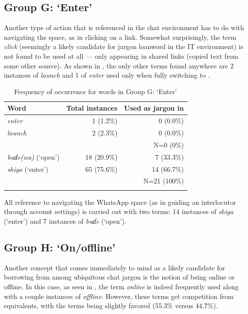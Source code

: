\documentclass[output=paper
,newtxmath
,modfonts
,nonflat]{langsci/langscibook}
\begin{document}
\subsection{Group G: ‘Enter’}

Another type of action that is referenced in the chat environment has to do with navigating the space, as in clicking on a link. Somewhat surprisingly, the  term \textit{click} (seemingly a likely candidate for jargon loanword in the IT environment) is not found to be used at all — only appearing in shared links (copied text from some other source). As shown in , the only other  terms found anywhere are 2 instances of \textit{launch} and 1 of \textit{enter} used only when fully switching to . 

\begin{table}
\begin{tabularx}{\textwidth}{Qrr}
\lsptoprule
Word & Total instances & Used as jargon in \\
\midrule
\textit{enter}  & 1 (1.2\%) & 0 (0.0\%)\\
\textit{launch} & 2 (2.3\%) & 0 (0.0\%)\\\midrule
& & N=0 (0\%)\\\midrule
\textit{buɗe(wa)} (‘open’) & 18 (20.9\%) & 7 (33.3\%)\\
\textit{shiga} (‘enter’)   & 65 (75.6\%) & 14 (66.7\%)\\\midrule
& & N=21 (100\%)\\
\lspbottomrule
\end{tabularx}
\caption{Frequency of occurrence for words in Group G: ‘Enter’}
\label{tab:purvis:9}
\end{table} 

All reference to navigating the WhatsApp space (as in guiding an interlocutor through account settings) is carried out with two  terms: 14 instances of \textit{shiga} (‘enter’) and 7 instances of \textit{buɗe} (‘open’).

\subsection{Group H: ‘On/offline’}

Another concept that comes immediately to mind as a likely candidate for borrowing from among ubiquitous  chat jargon is the notion of being online or offline. In this case, as seen in , the  term \textit{online} is indeed frequently used along with a couple instances of \textit{offline}. However, these terms get competition from  equivalents, with the  terms being slightly favored (55.3\% versus 44.7\%).
\end{document}
